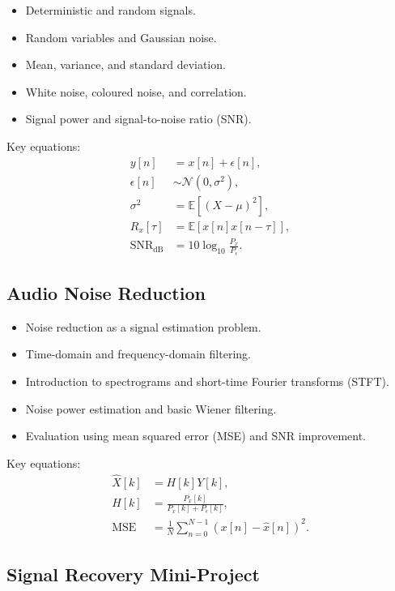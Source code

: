 \documentclass[12pt,fontset=none]{ctexart}
\begin{document}
\begin{itemize}
  \item Deterministic and random signals.
  \item Random variables and Gaussian noise.
  \item Mean, variance, and standard deviation.
  \item White noise, coloured noise, and correlation.
  \item Signal power and signal-to-noise ratio (SNR).
\end{itemize}

Key equations:
\begin{align*}
y[n] &= x[n]+\epsilon[n],\\
\epsilon[n] &\sim \mathcal{N}(0,\sigma^2),\\
\sigma^2 &= \mathbb{E}[(X-\mu)^2],\\
R_x[\tau] &= \mathbb{E}[x[n]x[n-\tau]],\\
\mathrm{SNR}_{\mathrm{dB}}
&=10\log_{10}\frac{P_x}{P_\epsilon}.
\end{align*}

\subsection{Audio Noise Reduction}

\begin{itemize}
  \item Noise reduction as a signal estimation problem.
  \item Time-domain and frequency-domain filtering.
  \item Introduction to spectrograms and
  short-time Fourier transforms (STFT).
  \item Noise power estimation and basic Wiener filtering.
  \item Evaluation using mean squared error (MSE)
  and SNR improvement.
\end{itemize}

Key equations:
\begin{align*}
\hat X[k] &= H[k]Y[k],\\
H[k] &= \frac{P_x[k]}{P_x[k]+P_\epsilon[k]},\\
\mathrm{MSE}
&= \frac{1}{N}\sum_{n=0}^{N-1}
(x[n]-\hat x[n])^2.
\end{align*}

\subsection{Signal Recovery Mini-Project}
\end{document}

